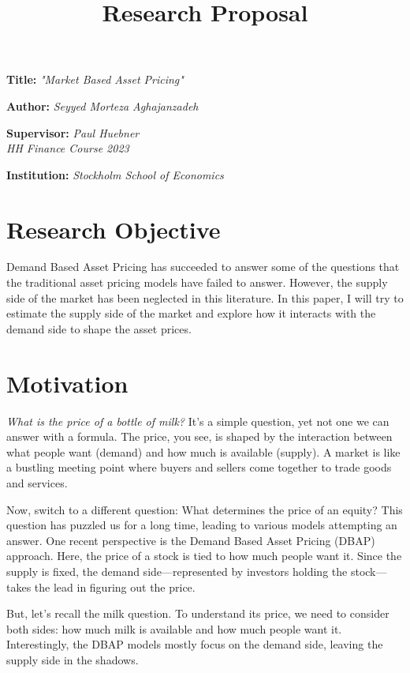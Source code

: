 \documentclass[a4paper]{article}
\title{\textbf{Research Proposal}}
\author{}
\date{}
\newcommand{\namelistlabel}[1]{\mbox{#1}\hfil}
\newenvironment{namelist}[1]{%
	\begin{list}{}
		{
			\let\makelabel\namelistlabel
			\settowidth{\labelwidth}{#1}
			\setlength{\leftmargin}{1.1\labelwidth}
		}
	}{%
\end{list}}
\begin{document}
\maketitle
\begin{namelist}{xxxxxxxxxxxx}
	\item[{\bf Title:}]
	\textit{"Market Based Asset Pricing"}
	\item[{\bf Author:}]
	\textit{ Seyyed Morteza Aghajanzadeh}
	\item[{\bf Supervisor:}]
	\textit{Paul Huebner \\ HH Finance Course 2023}
	\item[{\bf Institution:}]
	\textit{	Stockholm School of Economics}
\end{namelist}


\section*{Research Objective}
Demand Based Asset Pricing has succeeded to answer some of the questions that the traditional asset pricing models have failed to answer. However, the supply side of the market has been neglected in this literature. In this paper, I will try to estimate the supply side of the market and explore how it interacts with the demand side to shape the asset prices.


\section*{Motivation}
\textit{What is the price of a bottle of milk?}  It's a simple question, yet not one we can answer with a formula. The price, you see, is shaped by the interaction between what people want (demand) and how much is available (supply). A market is like a bustling meeting point where buyers and sellers come together to trade goods and services.

Now, switch to a different question: What determines the price of an equity? This question has puzzled us for a long time, leading to various models attempting an answer. One recent perspective is the Demand Based Asset Pricing (DBAP) approach. Here, the price of a stock is tied to how much people want it. Since the supply is fixed, the demand side—represented by investors holding the stock—takes the lead in figuring out the price.

But, let's recall the milk question. To understand its price, we need to consider both sides: how much milk is available and how much people want it. Interestingly, the DBAP models mostly focus on the demand side, leaving the supply side in the shadows.
\end{document}
